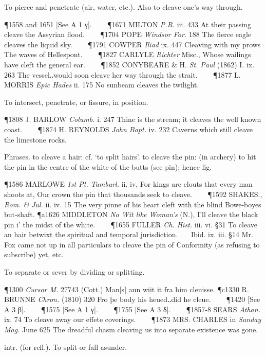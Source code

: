 \begin{description}[wide, labelwidth=!, labelindent=0pt]
\begin{myenumerate}
 To pierce and penetrate (air, water, etc.). Also to cleave one's way through.

\P 1558 and 1651 [See  A 1 γ].    
\P 1671 MILTON  \textit{P.R.} iii. 433 At their passing cleave the Assyrian flood.    
\P 1704 POPE  \textit{Windsor For.} 188 The fierce eagle cleaves the liquid sky.    
\P 1791 COWPER  \textit{Iliad} ix. 447 Cleaving with my prows The waves of Hellespont.    
\P 1827 CARLYLE  \textit{Richter} Misc., Whose wailings have cleft the general ear.    
\P 1852 CONYBEARE  \& H. \textit{St. Paul} (1862) I. ix. 263 The vessel‥would soon cleave her way through the strait.    
\P 1877 L. MORRIS  \textit{Epic Hades} ii. 175 No sunbeam cleaves the twilight.

 To intersect, penetrate, or fissure, in position.

\P 1808 J. BARLOW  \textit{Columb.} i. 247 Thine is the stream; it cleaves the well known coast.    
\P 1874 H. REYNOLDS  \textit{John Bapt.} iv. 232 Caverns which still cleave the limestone rocks.

 Phrases. to cleave a hair: cf. ‘to split hairs’. to cleave the pin: (in archery) to hit the pin in the centre of the white of the butts (see pin); hence fig.

\P 1586 MARLOWE  \textit{1st Pt. Tamburl.} ii. iv, For kings are clouts that every man shoots at, Our crown the pin that thousands seek to cleave.    
\P 1592 SHAKES.,  \textit{Rom. \& Jul.} ii. iv. 15 The very pinne of his heart cleft with the blind Bowe-boyes but-shaft.
\P a1626 MIDDLETON  \textit{No Wit like Woman's} (N.), I'll cleave the black pin i' the midst of the white.    
\P 1655 FULLER  \textit{Ch. Hist.} iii. vi. §31 To cleave an hair betwixt the spiritual and temporal jurisdiction.    Ibid. ix. iii. §14 Mr. Fox came not up in all particulars to cleave the pin of Conformity (as refusing to subscribe) yet, etc.

 To separate or sever by dividing or splitting.

\P 1300  \textit{Cursor M.} 27743 (Cott.) Man[s] aun wiit it fra him cleuisse.
\P c1330 R. BRUNNE  \textit{Chron.} (1810) 320 Fro þe body his heued‥did he cleue.    
\P 1420 [See A 3 β].    
\P 1575 [See A 1 γ].    
\P 1755 [See A 3 δ].    
\P 1857-8 SEARS \textit{Athan.} ix. 74 To cleave away our effete coverings.    
\P 1873 MRS. CHARLES in \textit{Sunday Mag.} June 625 The dreadful chasm cleaving us into separate existence was gone.

 intr. (for refl.). To split or fall asunder.


\end{myenumerate}
\end{description}
